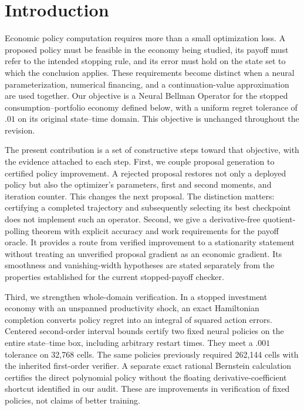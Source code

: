 \section{Introduction}\label{sec:introduction}
Economic policy computation requires more than a small optimization loss. A proposed policy must be feasible in the economy being studied, its payoff must refer to the intended stopping rule, and its error must hold on the state set to which the conclusion applies. These requirements become distinct when a neural parameterization, numerical financing, and a continuation-value approximation are used together. Our objective is a Neural Bellman Operator for the stopped consumption--portfolio economy defined below, with a uniform regret tolerance of $.01$ on its original state--time domain. This objective is unchanged throughout the revision.

The present contribution is a set of constructive steps toward that objective, with the evidence attached to each step. First, we couple proposal generation to certified policy improvement. A rejected proposal restores not only a deployed policy but also the optimizer's parameters, first and second moments, and iteration counter. This changes the next proposal. The distinction matters: certifying a completed trajectory and subsequently selecting its best checkpoint does not implement such an operator. Second, we give a derivative-free quotient-polling theorem with explicit accuracy and work requirements for the payoff oracle. It provides a route from verified improvement to a stationarity statement without treating an unverified proposal gradient as an economic gradient. Its smoothness and vanishing-width hypotheses are stated separately from the properties established for the current stopped-payoff checker.

Third, we strengthen whole-domain verification. In a stopped investment economy with an unspanned productivity shock, an exact Hamiltonian completion converts policy regret into an integral of squared action errors. Centered second-order interval bounds certify two fixed neural policies on the entire state--time box, including arbitrary restart times. They meet a $.001$ tolerance on 32,768 cells. The same policies previously required 262,144 cells with the inherited first-order verifier. A separate exact rational Bernstein calculation certifies the direct polynomial policy without the floating derivative-coefficient shortcut identified in our audit. These are improvements in verification of fixed policies, not claims of better training.

